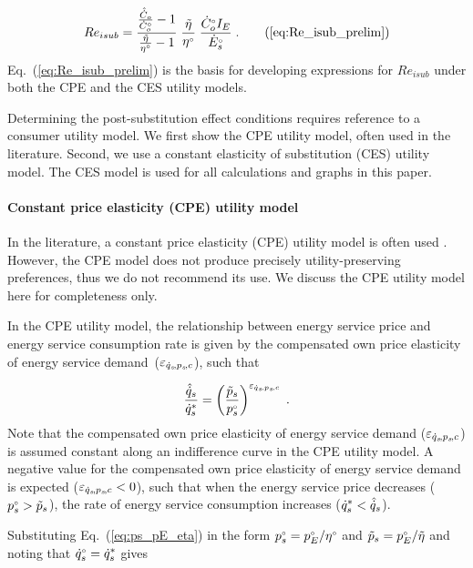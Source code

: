 \begin{equation}
  Re_{isub} = \frac{\frac{\rasub{C}_o}{\rorig{C}_o} - 1}{\etaratiostacked - 1} \; 
                          \etaratiostacked \; 
                          \frac{\rbempl{C}_o I_E}{\rbempl{E}_s} \; .
                              \tag{\ref{eq:Re_isub_prelim}}
\end{equation}
%
Eq.~(\ref{eq:Re_isub_prelim}) is the basis for
developing expressions for $Re_{isub}$ under both the 
CPE and the CES utility models.

Determining the post-substitution effect conditions
requires reference to a consumer utility model.
We first show the CPE utility model, often used in the literature. 
Second, we use a constant elasticity of substitution (CES)
utility model. 
The CES model is used for all calculations and graphs in this paper.


\paragraph{Constant price elasticity (CPE) utility model} 
\label{sec:Resub_approximate_method}

In the literature, a constant price elasticity (CPE) utility model
is often used 
\citep[p.~17, footnote~43]{Borenstein:2015aa}.
However, the CPE model does not produce precisely
utility-preserving preferences, thus we do not recommend its use.
We discuss the CPE utility model here for completeness only.

In the CPE utility model, 
the relationship between energy service price and energy service consumption rate
is given by the compensated own price elasticity of energy service demand~($\varepsilon_{\dot{q}_s\!,p_s\!,c}$),
such that

\begin{equation}
  \frac{\hat{\dot{q}}_s}{{\dot{q}}^*_s} = \left( \frac{\tilde{p}_s}{{}{p}^{\scriptscriptstyle \circ}_s} \right)^{\varepsilon_{\dot{q}_s\!,p_s\!,c}} \; .
\end{equation}
%
Note that the compensated own price elasticity of energy service demand ($\varepsilon_{\dot{q}_s\!,p_s\!,c}$)
is assumed constant along an indifference curve
in the CPE utility model. 
A negative value for the compensated own price elasticity of energy service demand
is expected ($\varepsilon_{\dot{q}_s\!,p_s\!,c} < 0$),
such that when the energy service price decreases 
(${}{p}^{\scriptscriptstyle \circ}_s > \tilde{p}_s $),
the rate of energy service consumption increases 
(${\dot{q}}^*_s < \hat{\dot{q}}_s$).

Substituting Eq.~(\ref{eq:ps_pE_eta}) in the form
${}{p}^{\scriptscriptstyle \circ}_s = {}{p}^{\scriptscriptstyle \circ}_E/{}{\eta}^{\scriptscriptstyle \circ}$ and
$\tilde{p}_s = {}{p}^{\scriptscriptstyle \circ}_E/\tilde{\eta}$
and noting that ${}{\dot{q}}^{\scriptscriptstyle \circ}_s = {\dot{q}}^*_s$ gives

